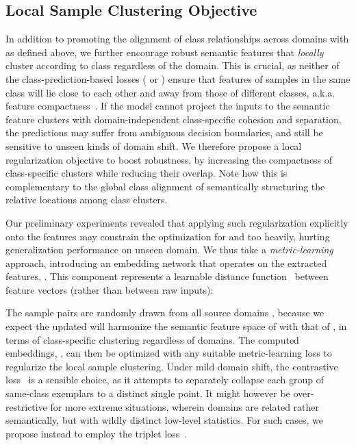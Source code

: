 \documentclass{article}
\begin{document}
\subsection{Local Sample Clustering Objective}\label{sec:local_loss}

\newcommand{\Margin}{\xi}

In addition to promoting the alignment of class relationships across domains with  as defined above, we further encourage robust semantic features that \emph{locally} cluster according to class regardless of the domain. This is crucial, as neither of the class-prediction-based losses ( or ) ensure that features of samples in the same class will lie close to each other and away from those of different classes, a.k.a. feature compactness~\cite{kamnitsas2018semi}.
If the model cannot project the inputs to the semantic feature clusters with domain-independent class-specific cohesion and separation, the predictions may suffer from ambiguous decision boundaries, and still be sensitive to unseen kinds of domain shift. We therefore propose a local regularization objective  to boost robustness, by increasing the compactness of class-specific clusters while reducing their overlap. Note how this is complementary to the global class alignment of semantically structuring the relative locations among class clusters.


Our preliminary experiments revealed that applying such regularization explicitly onto the features may constrain the optimization for  and  too heavily, hurting generalization performance on unseen domain. We thus take a \emph{metric-learning} approach, introducing an embedding network  that operates on the extracted features, . This component represents a learnable distance function~\citep{chopra2005learning} between feature vectors (rather than between raw inputs):

The sample pairs  are randomly drawn from all source domains , because we expect the updated  will harmonize the semantic feature space of  with that of , in terms of class-specific clustering regardless of domains.
The computed embeddings, , can then be optimized with any suitable metric-learning loss  to regularize the local sample clustering.
Under mild domain shift, the contrastive loss~\citep{hadsell2006dimensionality} is a sensible choice, as it attempts to separately collapse each group of same-class exemplars to a distinct single point. It might however be over-restrictive for more extreme situations, wherein domains are related rather semantically, but with wildly distinct low-level statistics. For such cases, we propose instead to employ the triplet loss~\citep{schroff2015facenet}.
\end{document}
